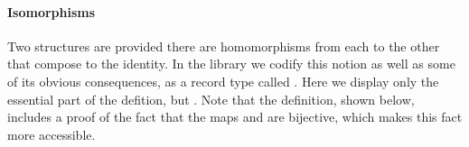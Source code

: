 \begin{code}
\>[23]\AgdaSymbol{(}%
\>[31]%
\>[36]%
\>[39]%
\>[42]\AgdaSymbol{))))}%
\>[48]%
\>[53]\AgdaSpace{}%
\AgdaSymbol{((}\AgdaSpace{}%
\AgdaSpace{}%
\AgdaSymbol{)(}\AgdaSpace{}%
\AgdaSpace{}%
\AgdaSymbol{))}%
\>[97]\<%
\\
%
\>[4]\AgdaSymbol{(}%
\>[14]\AgdaSymbol{(}\AgdaSpace{}%
\AgdaSpace{}%
\AgdaSymbol{)}%
\>[23]\AgdaSymbol{(}%
\>[31]%
\>[36]%
\>[39]%
\>[42]\AgdaSymbol{))}%
\>[48]%
\>[53]\AgdaSpace{}%
\AgdaSpace{}%
\AgdaSpace{}%
%
\>[97]\<%
\\
%
\>[14]\AgdaSymbol{(}\AgdaSpace{}%
\AgdaSpace{}%
\AgdaSymbol{)}%
\>[23]\AgdaSymbol{(}\AgdaSpace{}%
\AgdaSpace{}%
\AgdaSymbol{(}%
\>[31]%
\>[36]%
\>[39]%
\>[42]\AgdaSymbol{))}%
\>[48]\AgdaSpace{}%
\AgdaSpace{}%
\AgdaSpace{}%
\AgdaSpace{}%
\AgdaOperator{\AgdaFunction{𝔻[}}\AgdaSpace{}%
\AgdaSpace{}%
\AgdaOperator{\AgdaFunction{]}}\<%
\\
%
\\[\AgdaEmptyExtraSkip]%
%
\>[2]\AgdaSpace{}%
\AgdaSymbol{:}\AgdaSpace{}%
\AgdaSpace{}%
\AgdaSpace{}%
\AgdaSpace{}%
\<%
\\
%
\>[2]\AgdaSpace{}%
\AgdaSpace{}%
\AgdaSymbol{=}\AgdaSpace{}%
\<%
\end{code}
\paragraph*{Isomorphisms}
\fi      %

Two structures are  provided there are homomorphisms from each to the
other that compose to the identity. In the \agdaalgebras library we codify this notion as
well as some of its obvious consequences, as a record type called .
\ifshort
Here we display only the essential part of the defition, but \seemedium.
\else
Note that the definition, shown below, includes a proof of the fact that the maps  and
 are bijective, which makes this fact more accessible.

